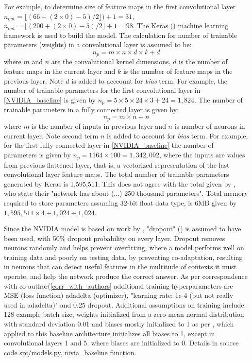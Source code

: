 For example, to determine size of feature maps in the first convolutional layer $n_{out}=\lfloor(66+(2\times0)-5)/2\rfloor)+1=31$, $n_{out}=\lfloor(200+(2\times0)-5)/2\rfloor+1=98$. The Keras (\cite{chollet2015keras}) machine learning framework is used to build the model. The calculation for number of trainable parameters (weights) in a convolutional layer is assumed to be:
\begin{equation}
    \label{eq:feature_map}
    n_p= m \times n \times  d \times k + d
\end{equation}
where $m$ and $n$ are the convolutional kernel dimensions, $d$ is the number of feature maps in the current layer and $k$ is the number of feature maps in the previous layer. Note $d$ is added to acccount for \textit{bias} term. For example, the number of trainable parameters for the first convolutional layer in \ref{NVIDIA_baseline} is given by $n_p = 5 \times 5 \times 24 \times 3 + 24 = 1,824$. The number of trainable parameters in a fully connected layer is given by:
\begin{equation}
    \label{eq:feature_map}
    n_p= m \times n + n
\end{equation}
where $m$ is the number of inputs in previous layer and $n$ is number of neurons in current layer. Note second term $n$ is added to account for \textit{bias} term. For example, for the first fully connected layer in \ref{NVIDIA_baseline} the number of parameters is given by $n_p = 1164 \times 100 = 1,342,092$, where the inputs are values from previous flattened layer, that is, a vectorized representation of the last convolutional layer feature maps.  
The total number of trainable parameters generated by Keras is 1,595,511. This does not agree with the total given by \cite{bojarski2016end}, who state their "network  has  about (...) 250 thousand parameters". Total memory required to store parameters assuming 32-bit float data type, is 6MB given by $1,595,511 \times 4 \div 1,024 \div 1,024$.

Since the NVIDIA model is based on work by \cite{krizhevsky2012imagenet}, "dropout" (\cite{hinton2012improving}) is assumed to have been used, with 50\% dropout probability on every layer.  
Dropout removes neurons randomly and helps prevent overfitting, where a model performs well on training data and poorly on testing data, by preventing co-adaptation, resulting in neurons that can detect useful features in the multitude of contexts it must operate, and help the network produce the correct answer.
As per correspondence with co-author(\ref{corr_with_authors} additional training hyperparameters are MSE (loss function) 
adadelta (optimizer), "learning rate: 1e-4 (but not really used in adadelta)" and 0.25 dropout.
Additional assumptions on training include: 128 example batch size, weights initialized from a zero-mean normal distribution with standard deviation 0.01 and biases mostly initialized to 1 as per \cite{krizhevsky2012imagenet}, which applied to this baseline architecture initializes all biases to 1, except in convolutional layers 1 and 5, where biases are initialized to 0. Details in source code src/models.py, nivia\_baseline function.  


